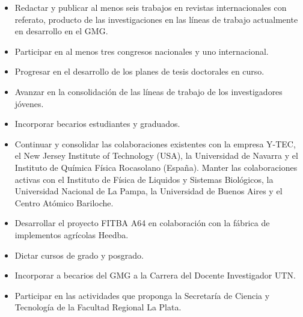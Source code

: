 \documentclass[a4paper,11pt,twoside,final,titlepage,onecolumn,openright]{report}
\begin{document}
\begin{itemize}
\item  Redactar y publicar al menos seis trabajos en revistas internacionales con referato, producto de las investigaciones en las líneas de trabajo actualmente en desarrollo en el GMG.
\item  Participar en al menos tres congresos nacionales y uno internacional. 
\item  Progresar en el desarrollo de los planes de tesis doctorales en curso.
\item  Avanzar en la consolidación de las líneas de trabajo de los investigadores jóvenes. 
\item  Incorporar becarios estudiantes y graduados. 
\item  Continuar y consolidar las colaboraciones existentes con la empresa Y-TEC, el New Jersey Institute of Technology (USA), la Universidad de Navarra y el Instituto de Química Física Rocasolano (España). Manter las colaboraciones activas con el Instituto de Física de Liquidos y Sistemas Biológicos, la Universidad Nacional de La Pampa, la Universidad de Buenos Aires y el Centro Atómico Bariloche.
\item Desarrollar el proyecto FITBA A64 en colaboración con la fábrica de implementos agrícolas Heedba.
\item  Dictar cursos de grado y posgrado.
\item  Incorporar a becarios del GMG a la Carrera del Docente Investigador UTN.
\item  Participar en las actividades que proponga la Secretaría de Ciencia y Tecnología de la Facultad Regional La Plata.
\end{itemize}
\end{document}
